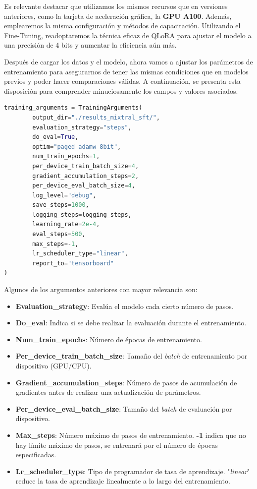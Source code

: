 Es relevante destacar que utilizamos los mismos recursos que en versiones anteriores, como la tarjeta de aceleración gráfica, la \textbf{GPU A100}. Además, emplearemos la misma configuración y métodos de capacitación. Utilizando el Fine-Tuning, readoptaremos la técnica eficaz de \acrshort{QLoRA} para ajustar el modelo a una precisión de 4 bits y aumentar la eficiencia aún más.

\bigskip %

Después de cargar los datos y el modelo, ahora vamos a ajustar los parámetros de entrenamiento para asegurarnos de tener las mismas condiciones que en modelos previos y poder hacer comparaciones válidas.
A continuación, se presenta esta disposición para comprender minuciosamente los campos y valores asociados.

\bigskip %

\begin{lstlisting}[language=Python, caption={Argumentos del entrenamiento.}, label=listado5]
training_arguments = TrainingArguments(
        output_dir="./results_mixtral_sft/",
        evaluation_strategy="steps",
        do_eval=True,
        optim="paged_adamw_8bit",
        num_train_epochs=1,
        per_device_train_batch_size=4,
        gradient_accumulation_steps=2,
        per_device_eval_batch_size=4,
        log_level="debug",
        save_steps=1000,
        logging_steps=logging_steps,
        learning_rate=2e-4,
        eval_steps=500,
        max_steps=-1,
        lr_scheduler_type="linear",
        report_to="tensorboard"  
)
\end{lstlisting}

\bigskip %

Algunos de los argumentos anteriores con mayor relevancia son:

\begin{itemize}
    \item \textbf{Evaluation\_strategy}: Evalúa el modelo cada cierto número de pasos.
    \item \textbf{Do\_eval}: Indica si se debe realizar la evaluación durante el entrenamiento.
    \item \textbf{Num\_train\_epochs}: Número de épocas de entrenamiento.
    \item \textbf{Per\_device\_train\_batch\_size}: Tamaño del \textit{batch} de entrenamiento por dispositivo (GPU/CPU).
    \item \textbf{Gradient\_accumulation\_steps}: Número de pasos de acumulación de gradientes antes de realizar una actualización de parámetros.
    \item \textbf{Per\_device\_eval\_batch\_size}: Tamaño del \textit{batch} de evaluación por dispositivo.
    \item \textbf{Max\_steps}: Número máximo de pasos de entrenamiento. \textbf{-1} indica que no hay límite máximo de pasos, se entrenará por el número de épocas especificadas.
    \item \textbf{Lr\_scheduler\_type}: Tipo de programador de tasa de aprendizaje. "\textit{linear}" reduce la tasa de aprendizaje linealmente a lo largo del entrenamiento.
\end{itemize}


